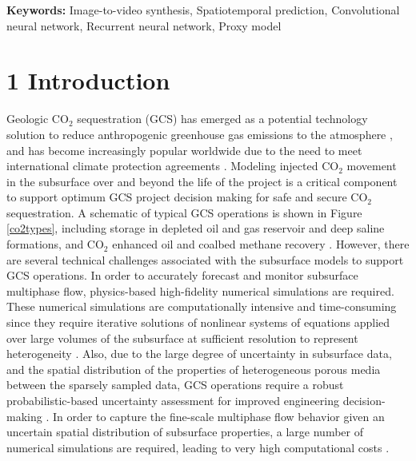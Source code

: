 \documentclass[10pt, twoside]{article}
\begin{document}
\textbf{Keywords:} Image-to-video synthesis, Spatiotemporal prediction, Convolutional neural network, Recurrent neural network, Proxy model

\section*{\textbf{1 Introduction}}
Geologic CO$_2$ sequestration (GCS) has emerged as a potential technology solution to reduce anthropogenic greenhouse gas emissions to the atmosphere \cite{Michael2010, Goodman2013329, Levine201681}, and has become increasingly popular worldwide due to the need to meet international climate protection agreements \cite{metz2005ipcc, Energy20202010EuropeanCommission, Unitednations2015AgreementP}. Modeling injected CO$_2$ movement in the subsurface over and beyond the life of the project is a critical component to support optimum GCS project decision making for safe and secure CO$_2$ sequestration. A schematic of typical GCS operations is shown in Figure \ref{co2types}, including storage in depleted oil and gas reservoir and deep saline formations, and CO$_2$ enhanced oil and coalbed methane recovery \cite{Bachu2015188, Tapia2016337, Castelletto2013570}. However, there are several technical challenges associated with the subsurface models to support GCS operations. In order to accurately forecast and monitor subsurface multiphase flow, physics-based high-fidelity numerical simulations are required. These numerical simulations are computationally intensive and time-consuming since they require iterative solutions of nonlinear systems of equations applied over large volumes of the subsurface at sufficient resolution to represent heterogeneity \cite{Rashid201321, Luo2011759, 2021AGUFM.H25O1207S}. Also, due to the large degree of uncertainty in subsurface data, and the spatial distribution of the properties of heterogeneous porous media between the sparsely sampled data, GCS operations require a robust probabilistic-based uncertainty assessment for improved engineering decision-making \cite{Chen2018, Sun2019, Chen2020}. In order to capture the fine-scale multiphase flow behavior given an uncertain spatial distribution of subsurface properties, a large number of numerical simulations are required, leading to very high computational costs \cite{Li2015389, Jiang2023}. 
\end{document}
